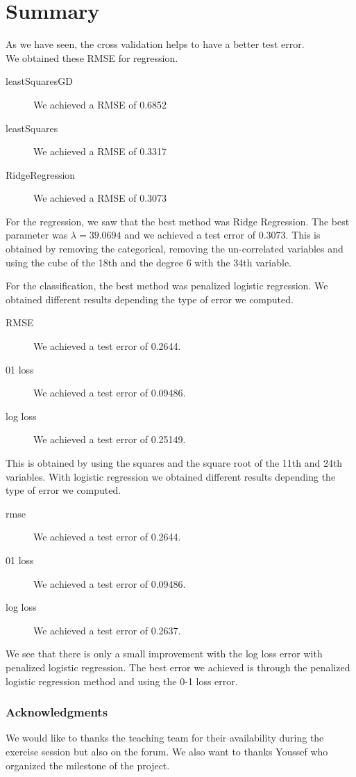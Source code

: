 \documentclass{article} %
\begin{document}
\section{Summary}
As we have seen, the cross validation helps to have a better test error.\\
We obtained these RMSE for regression.
\begin{description}
\item[leastSquaresGD] We achieved a RMSE of 0.6852
\item[leastSquares] We achieved a RMSE of 0.3317
\item[RidgeRegression] We achieved a RMSE of 0.3073
\end{description}
For the regression, we saw that the best method was Ridge Regression. The best parameter was $\lambda =  39.0694$ and we achieved a test error of 0.3073. This is obtained by removing the categorical, removing the un-correlated variables and using the cube of the 18th and the degree 6 with the 34th variable.

For the classification, the best method was penalized logistic regression. We obtained different results depending the type of error we computed. \begin{description}
\item[RMSE] We achieved a test error of 0.2644.
\item[01 loss]We achieved a test error of 0.09486.
\item[log loss] We achieved a test error of 0.25149.
\end{description}
This is obtained by using the squares and the square root of the 11th and 24th variables.
With logistic regression we obtained different results depending the type of error we computed. \begin{description}
\item[rmse] We achieved a test error of 0.2644.
\item[01 loss]We achieved a test error of 0.09486.
\item[log loss] We achieved a test error of 0.2637.
\end{description}
We see that there is only a small improvement with the log loss error with penalized logistic regression.
The best error we achieved is through the penalized logistic regression method and using the 0-1 loss error.

\subsubsection*{Acknowledgments}
We would like to thanks the teaching team for their availability during the exercise session but also on the forum. We also want to thanks Youssef who organized the milestone of the project.
\end{document}
